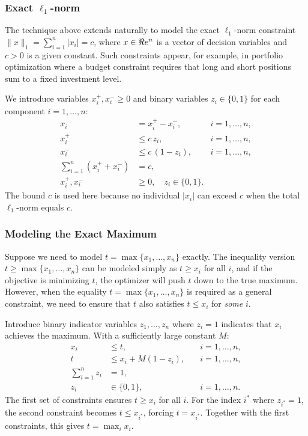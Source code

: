 \subsubsection{Exact $\ell_1$-norm}
The technique above extends naturally to model the exact $\ell_1$-norm constraint
$\|x\|_1 = \sum_{i=1}^{n} |x_i| = c$,
where $x \in \Re e^n$ is a vector of decision variables and $c > 0$ is a given constant.
Such constraints appear, for example, in portfolio optimization where a budget constraint requires that long and short positions sum to a fixed investment level.

We introduce variables $x_i^+, x_i^- \geq 0$ and binary variables $z_i \in \{0,1\}$ for each component $i = 1, \ldots, n$:
\begin{align*}
x_i &= x_i^+ - x_i^-, \quad &i = 1, \ldots, n,\\
x_i^+ &\leq c\, z_i, \quad &i = 1, \ldots, n,\\
x_i^- &\leq c\,(1 - z_i), \quad &i = 1, \ldots, n,\\
\sum_{i=1}^n (x_i^+ + x_i^-) &= c,\\
x_i^+, x_i^- &\geq 0, \quad z_i \in \{0,1\}.
\end{align*}
The bound $c$ is used here because no individual $|x_i|$ can exceed $c$ when the total $\ell_1$-norm equals $c$.

\subsubsection{Modeling the Exact Maximum}
Suppose we need to model $t = \max\{x_1, \ldots, x_n\}$ exactly.
The inequality version $t \geq \max\{x_1, \ldots, x_n\}$ can be modeled simply as $t \geq x_i$ for all $i$, and if the objective is minimizing $t$, the optimizer will push $t$ down to the true maximum.
However, when the equality $t = \max\{x_1, \ldots, x_n\}$ is required as a general constraint, we need to ensure that $t$ also satisfies $t \leq x_i$ for \emph{some} $i$.

Introduce binary indicator variables $z_1, \ldots, z_n$ where $z_i = 1$ indicates that $x_i$ achieves the maximum.
With a sufficiently large constant $M$:
\begin{align*}
x_i &\leq t, \quad &i = 1, \ldots, n, \\
t &\leq x_i + M(1 - z_i), \quad &i = 1, \ldots, n, \\
\sum_{i=1}^n z_i &= 1,\\
z_i &\in \{0,1\}, \quad &i = 1, \ldots, n.
\end{align*}
The first set of constraints ensures $t \geq x_i$ for all $i$.
For the index $i^*$ where $z_{i^*} = 1$, the second constraint becomes $t \leq x_{i^*}$, forcing $t = x_{i^*}$.
Together with the first constraints, this gives $t = \max_i x_i$.

